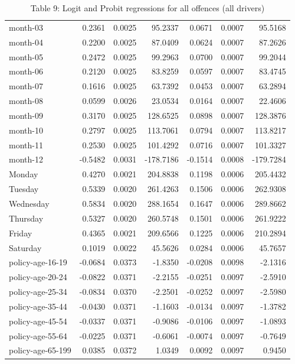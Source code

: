 \begin{table}[ht]
\begin{tabular}{lrrrrrr}
  month-03 & 0.2361 & 0.0025 & 95.2337 & 0.0671 & 0.0007 & 95.5168 \\ 
  month-04 & 0.2200 & 0.0025 & 87.0409 & 0.0624 & 0.0007 & 87.2626 \\ 
  month-05 & 0.2472 & 0.0025 & 99.2963 & 0.0700 & 0.0007 & 99.2044 \\ 
  month-06 & 0.2120 & 0.0025 & 83.8259 & 0.0597 & 0.0007 & 83.4745 \\ 
  month-07 & 0.1616 & 0.0025 & 63.7392 & 0.0453 & 0.0007 & 63.2894 \\ 
  month-08 & 0.0599 & 0.0026 & 23.0534 & 0.0164 & 0.0007 & 22.4606 \\ 
  month-09 & 0.3170 & 0.0025 & 128.6525 & 0.0898 & 0.0007 & 128.3876 \\ 
  month-10 & 0.2797 & 0.0025 & 113.7061 & 0.0794 & 0.0007 & 113.8217 \\ 
  month-11 & 0.2530 & 0.0025 & 101.4292 & 0.0716 & 0.0007 & 101.3327 \\ 
  month-12 & -0.5482 & 0.0031 & -178.7186 & -0.1514 & 0.0008 & -179.7284 \\ 
  Monday & 0.4270 & 0.0021 & 204.8838 & 0.1198 & 0.0006 & 205.4432 \\ 
  Tuesday & 0.5339 & 0.0020 & 261.4263 & 0.1506 & 0.0006 & 262.9308 \\ 
  Wednesday & 0.5834 & 0.0020 & 288.1654 & 0.1647 & 0.0006 & 289.8662 \\ 
  Thursday & 0.5327 & 0.0020 & 260.5748 & 0.1501 & 0.0006 & 261.9222 \\ 
  Friday & 0.4365 & 0.0021 & 209.6566 & 0.1225 & 0.0006 & 210.2894 \\ 
  Saturday & 0.1019 & 0.0022 & 45.5626 & 0.0284 & 0.0006 & 45.7657 \\ 
  policy-age-16-19 & -0.0684 & 0.0373 & -1.8350 & -0.0208 & 0.0098 & -2.1316 \\ 
  policy-age-20-24 & -0.0822 & 0.0371 & -2.2155 & -0.0251 & 0.0097 & -2.5910 \\ 
  policy-age-25-34 & -0.0834 & 0.0370 & -2.2501 & -0.0252 & 0.0097 & -2.5980 \\ 
  policy-age-35-44 & -0.0430 & 0.0371 & -1.1603 & -0.0134 & 0.0097 & -1.3782 \\ 
  policy-age-45-54 & -0.0337 & 0.0371 & -0.9086 & -0.0106 & 0.0097 & -1.0893 \\ 
  policy-age-55-64 & -0.0225 & 0.0371 & -0.6061 & -0.0074 & 0.0097 & -0.7649 \\ 
  policy-age-65-199 & 0.0385 & 0.0372 & 1.0349 & 0.0092 & 0.0097 & 0.9450 \\ 
   \hline
\end{tabular}
\caption{Table 9: Logit and Probit regressions for all offences (all drivers)} 
\label{tab_9_all_pts_A}
\end{table}


\clearpage
\pagebreak




